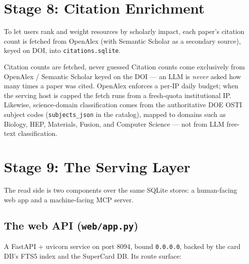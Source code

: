 \documentclass[11pt,letterpaper]{article}
\newcommand{\code}[1]{\texttt{\small #1}}
\begin{document}
\clearpage
\section{Stage 8: Citation Enrichment}

To let users rank and weight resources by scholarly impact, each paper's citation
count is fetched from OpenAlex (with Semantic Scholar as a secondary source), keyed
on DOI, into \code{citations.sqlite}.

\begin{rulebox}{Citation counts are fetched, never guessed}
Citation counts come exclusively from OpenAlex / Semantic Scholar keyed on the DOI
--- an LLM is \emph{never} asked how many times a paper was cited. OpenAlex enforces a
per-IP daily budget; when the serving host is capped the fetch runs from a
fresh-quota institutional IP. Likewise, science-domain classification comes from the
authoritative DOE OSTI subject codes (\code{subjects\_json} in the catalog), mapped
to domains such as Biology, HEP, Materials, Fusion, and Computer Science --- not from
LLM free-text classification.
\end{rulebox}

\section{Stage 9: The Serving Layer}

The read side is two components over the same SQLite stores: a human-facing web app
and a machine-facing MCP server.

\subsection{The web API (\code{web/app.py})}

A FastAPI + uvicorn service on port 8094, bound \code{0.0.0.0}, backed by the card DB's
FTS5 index and the SuperCard DB. Its route surface:
\end{document}
